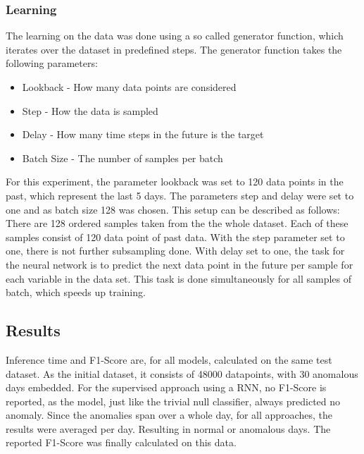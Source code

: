 \subsubsection{Learning}
The learning on the data was done using a so called generator function, which iterates over the dataset in predefined steps. The generator function takes the following parameters:

\begin{itemize}
	\item Lookback - How many data points are considered
	\item Step - How the data is sampled
	\item Delay - How many time steps in the future is the target
	\item Batch Size - The number of samples per batch
\end{itemize}

For this experiment, the parameter lookback was set to 120 data points in the past, which represent the last 5 days. The parameters step and delay were set to one and as batch size 128 was chosen. This setup can be described as follows: There are 128 ordered samples taken from the the whole dataset. Each of these samples consist of 120 data point of past data. With the step parameter set to one, there is not further subsampling done. With delay set to one, the task for the neural network is to predict the next data point in the future per sample for each variable in the data set. This task is done simultaneously for all samples of batch, which speeds up training.

\subsection{Results}

Inference time and F1-Score are, for all models, calculated on the same test dataset. As the initial dataset, it consists of 48000 datapoints, with 30 anomalous days embedded. For the supervised approach using a RNN, no F1-Score is reported, as the model, just like the trivial null classifier, always predicted no anomaly. Since the anomalies span over a whole day, for all approaches, the results were averaged per day. Resulting in normal or anomalous days. The reported F1-Score was finally calculated on this data. 


